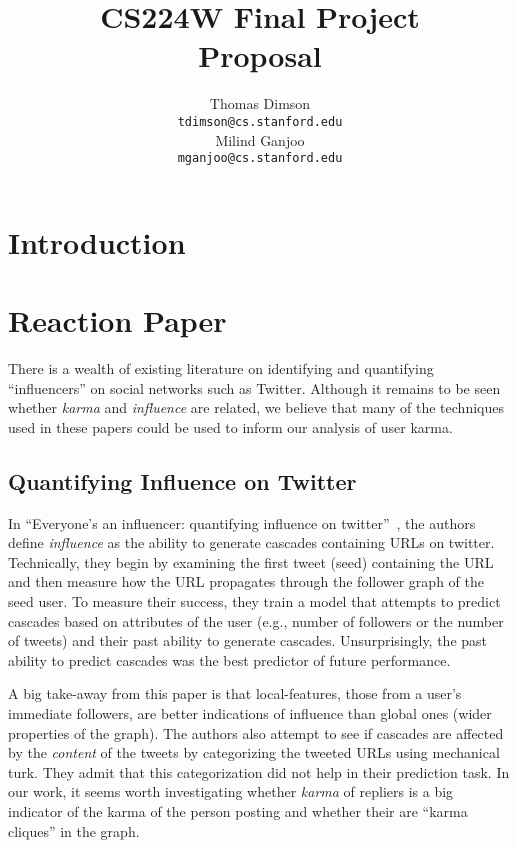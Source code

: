 \documentclass[11pt]{article}
\title{{\small CS224W Final Project} \\ Proposal}
\author{Thomas Dimson \\
  {\tt tdimson@cs.stanford.edu}
  \\\And
  Milind Ganjoo \\
  {\tt mganjoo@cs.stanford.edu}
}
\date{}
\newcommand{\titlecite}[2]{``#1''~\cite{#2}}
\begin{document}
\maketitle

\section{Introduction}

\section{Reaction Paper}
There is a wealth of existing literature on identifying and quantifying ``influencers''
on social networks such as Twitter. Although it remains to be seen whether \textit{karma} and
\textit{influence} are related, we believe that many of the techniques used in these papers
could be used to inform our analysis of user karma.

\subsection{Quantifying Influence on Twitter}
In \titlecite{Everyone's an influencer: quantifying influence on twitter}{bakshy2011everyone}, 
the authors define \textit{influence} as the ability to generate cascades containing
URLs on twitter. Technically, they begin by examining the first tweet (seed) containing the URL and
then measure how the URL propagates through the follower graph of the seed user. To measure their
success, they train a model that attempts to predict cascades based on attributes of the user
(e.g., number of followers or the number of tweets) and their past ability to generate cascades.
Unsurprisingly, the past ability to predict cascades was the best predictor of future performance.

A big take-away from this paper is that local-features, those from a user's immediate followers,
are better indications of influence than global ones (wider properties of the graph). The authors
also attempt to see if cascades are affected by the \textit{content} of the tweets by categorizing the 
tweeted URLs using mechanical turk. They admit that this categorization did not help in their
prediction task. In our work,
it seems worth investigating whether \textit{karma} of repliers is a big indicator of the karma
of the person posting and whether their are ``karma cliques'' in the graph. 
\end{document}

